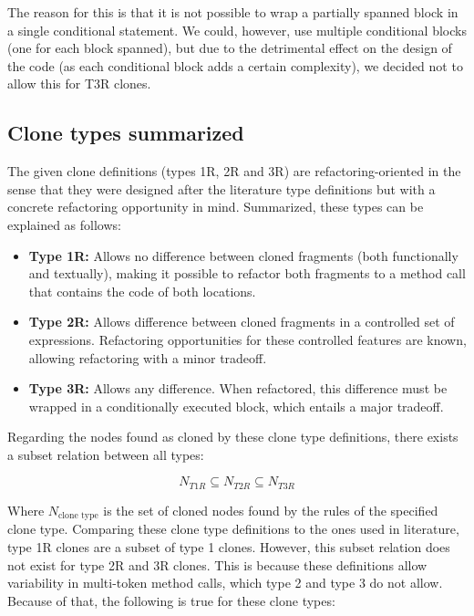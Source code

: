The reason for this is that it is not possible to wrap a partially spanned block in a single conditional statement. We could, however, use multiple conditional blocks (one for each block spanned), but due to the detrimental effect on the design of the code (as each conditional block adds a certain complexity), we decided not to allow this for T3R clones.

\subsection{Clone types summarized}
The given clone definitions (types 1R, 2R and 3R) are refactoring-oriented in the sense that they were designed after the literature type definitions but with a concrete refactoring opportunity in mind. Summarized, these types can be explained as follows:

\begin{itemize}
\item \textbf{Type 1R:} Allows no difference between cloned fragments (both functionally and textually), making it possible to refactor both fragments to a method call that contains the code of both locations. \\
\item \textbf{Type 2R:} Allows difference between cloned fragments in a controlled set of expressions. Refactoring opportunities for these controlled features are known, allowing refactoring with a minor tradeoff. \\
\item \textbf{Type 3R:} Allows any difference. When refactored, this difference must be wrapped in a conditionally executed block, which entails a major tradeoff.
\end{itemize}

Regarding the nodes found as cloned by these clone type definitions, there exists a subset relation between all types:

\begin{equation}\label{eq:typerelation}
N_{T1R} \subseteq N_{T2R} \subseteq N_{T3R}
\end{equation}

Where $N_{\text{clone type}}$ is the set of cloned nodes found by the rules of the specified clone type. Comparing these clone type definitions to the ones used in literature, type 1R clones are a subset of type 1 clones. However, this subset relation does not exist for type 2R and 3R clones. This is because these definitions allow variability in multi-token method calls, which type 2 and type 3 do not allow. Because of that, the following is true for these clone types:

